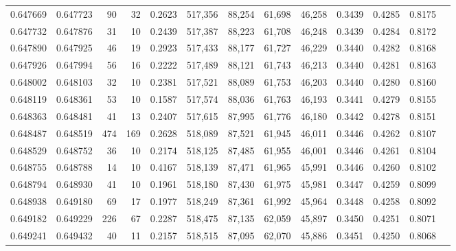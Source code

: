 \begin{tabular}{rrrrrrrrrrrrr}
0.647669 & 0.647723 &    90 &  32 &                                     0.2623 & 517,356 &  88,254 &  61,698 &  46,258 & 0.3439 & 0.4285 & 0.8175 \\
0.647732 & 0.647876 &    31 &  10 &                                     0.2439 & 517,387 &  88,223 &  61,708 &  46,248 & 0.3439 & 0.4284 & 0.8172 \\
0.647890 & 0.647925 &    46 &  19 &                                     0.2923 & 517,433 &  88,177 &  61,727 &  46,229 & 0.3440 & 0.4282 & 0.8168 \\
0.647926 & 0.647994 &    56 &  16 &                                     0.2222 & 517,489 &  88,121 &  61,743 &  46,213 & 0.3440 & 0.4281 & 0.8163 \\
0.648002 & 0.648103 &    32 &  10 &                                     0.2381 & 517,521 &  88,089 &  61,753 &  46,203 & 0.3440 & 0.4280 & 0.8160 \\
0.648119 & 0.648361 &    53 &  10 &                                     0.1587 & 517,574 &  88,036 &  61,763 &  46,193 & 0.3441 & 0.4279 & 0.8155 \\
0.648363 & 0.648481 &    41 &  13 &                                     0.2407 & 517,615 &  87,995 &  61,776 &  46,180 & 0.3442 & 0.4278 & 0.8151 \\
0.648487 & 0.648519 &   474 & 169 &                                     0.2628 & 518,089 &  87,521 &  61,945 &  46,011 & 0.3446 & 0.4262 & 0.8107 \\
0.648529 & 0.648752 &    36 &  10 &                                     0.2174 & 518,125 &  87,485 &  61,955 &  46,001 & 0.3446 & 0.4261 & 0.8104 \\
0.648755 & 0.648788 &    14 &  10 &                                     0.4167 & 518,139 &  87,471 &  61,965 &  45,991 & 0.3446 & 0.4260 & 0.8102 \\
0.648794 & 0.648930 &    41 &  10 &                                     0.1961 & 518,180 &  87,430 &  61,975 &  45,981 & 0.3447 & 0.4259 & 0.8099 \\
0.648938 & 0.649180 &    69 &  17 &                                     0.1977 & 518,249 &  87,361 &  61,992 &  45,964 & 0.3448 & 0.4258 & 0.8092 \\
0.649182 & 0.649229 &   226 &  67 &                                     0.2287 & 518,475 &  87,135 &  62,059 &  45,897 & 0.3450 & 0.4251 & 0.8071 \\
0.649241 & 0.649432 &    40 &  11 &                                     0.2157 & 518,515 &  87,095 &  62,070 &  45,886 & 0.3451 & 0.4250 & 0.8068 \\

\end{tabular}

